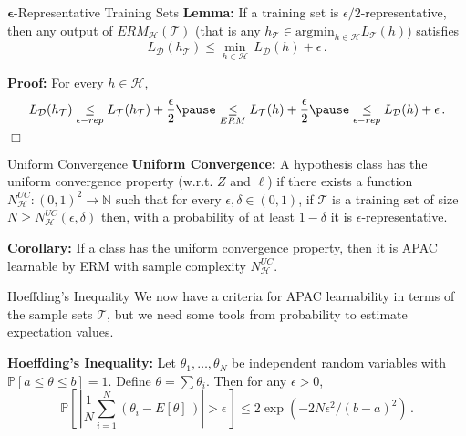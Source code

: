 \documentclass[10pt, table, dvipsnames,handout]{beamer}
\newcommand{\cT}{\ensuremath{\mathcal{T}}}
\newcommand{\cD}{\ensuremath{\mathcal{D}}}
\newcommand{\cH}{\ensuremath{\mathcal{H}}}
\newcommand{\bP}{\ensuremath{\mathbb{P}}}
\begin{document}
\begin{frame}[fragile]{$\mathbf{\epsilon}$-Representative Training Sets}
\textbf{Lemma:} If a training set is $\epsilon/2$-representative, then any output of $ERM_\cH(\cT)$ (that is any $h_\cT\in \text{argmin}_{h\in\cH}L_\cT(h)$) satisfies 
$$
L_\cD(h_\cT) \leq \min_{h\in \cH}\, L_\cD(h) + \epsilon\,.
$$\pause

\textbf{Proof:} For every $h\in \cH$, 
$$
L_\cD(h_\cT)  \underset{\epsilon-rep}{\leq} L_\cT(h_\cT) + \frac\epsilon2 \pause \underset{ERM}{\leq}  L_\cT(h) + \frac\epsilon2  \pause \underset{\epsilon-rep}{\leq}  L_\cD(h) + \epsilon\,.
$$
\hspace*{\fill}$\Box$

\end{frame}



\begin{frame}[fragile]{Uniform Convergence}
\textbf{Uniform Convergence:} A hypothesis class has the uniform convergence property (w.r.t. $Z$ and $\ell$) if there exists a function $N^{UC}_\cH:(0,1)^2\to\mathbb{N}$ such that for every $\epsilon,\delta \in (0,1)$, if $\cT$ is a training set of size $N\geq N^{UC}_\cH(\epsilon, \delta)$ then, with a probability of at least $1-\delta$ it is $\epsilon$-representative.\newline\pause

\textbf{Corollary:} If a class has the uniform convergence property, then it is APAC learnable by ERM with sample complexity $N^{UC}_\cH$.

\end{frame}




\begin{frame}[fragile]{Hoeffding's Inequality}
We now have a criteria for APAC learnability in terms of the sample sets $\cT$, but we need some tools from probability to estimate expectation values. \newline\pause

\textbf{Hoeffding's Inequality:} Let $\theta_1,\ldots, \theta_N$ be independent random variables with $\bP[a\leq \theta\leq b] = 1$. Define $\theta = \sum \theta_i$. Then for any $\epsilon>0$, 
$$
\bP\left[\, \left|\frac{1}{N} \sum_{i=1}^N(\theta_i - E[\theta]\,)\right|>\epsilon  \,\right]\leq 2\exp\left(-2N\epsilon^2/(b-a)^2\right)\,.
$$
\end{frame}
\end{document}
